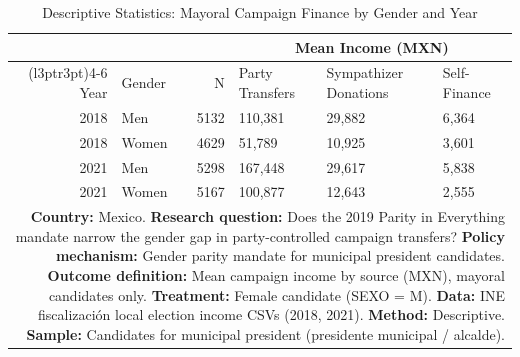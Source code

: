 \begin{table}[!h]
\centering
\caption{\label{tab:tab1_descriptive}Descriptive Statistics: Mayoral Campaign Finance by Gender and Year}
\centering
\begin{tabular}[t]{rlrlll}
\toprule
\multicolumn{3}{c}{ } & \multicolumn{3}{c}{Mean Income (MXN)} \\
\cmidrule(l{3pt}r{3pt}){4-6}
Year & Gender & N & Party Transfers & Sympathizer Donations & Self-Finance\\
\midrule
2018 & Men & 5132 & 110,381 & 29,882 & 6,364\\
2018 & Women & 4629 & 51,789 & 10,925 & 3,601\\
2021 & Men & 5298 & 167,448 & 29,617 & 5,838\\
2021 & Women & 5167 & 100,877 & 12,643 & 2,555\\
\bottomrule
\multicolumn{6}{p{0.95\textwidth}}{\rule{0pt}{1em}\footnotesize\textbf{Country:} Mexico. \textbf{Research question:} Does the 2019 Parity in Everything mandate narrow the gender gap in party-controlled campaign transfers? \textbf{Policy mechanism:} Gender parity mandate for municipal president candidates. \textbf{Outcome definition:} Mean campaign income by source (MXN), mayoral candidates only. \textbf{Treatment:} Female candidate (SEXO = M). \textbf{Data:} INE fiscalizaci\'{o}n local election income CSVs (2018, 2021). \textbf{Method:} Descriptive. \textbf{Sample:} Candidates for municipal president (presidente municipal / alcalde). }\\
\end{tabular}
\end{table}
